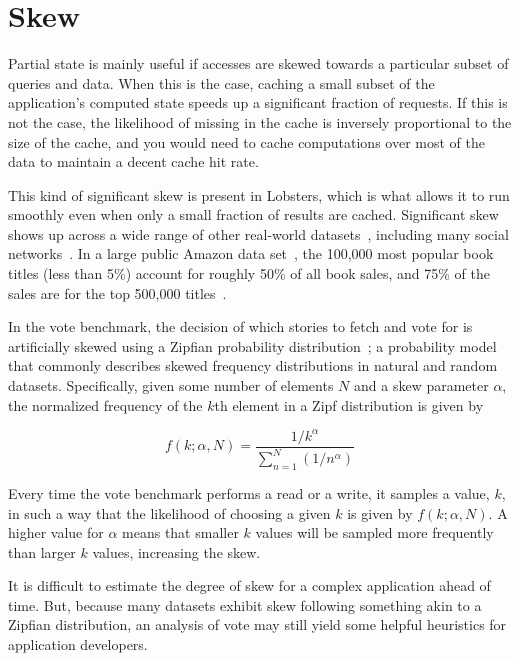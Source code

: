 \section{Skew}
\label{s:eval:patterns}

Partial state is mainly useful if accesses are skewed towards a particular
subset of queries and data. When this is the case, caching a small subset of the
application's computed state speeds up a significant fraction of requests. If
this is not the case, the likelihood of missing in the cache is inversely
proportional to the size of the cache, and you would need to cache computations
over most of the data to maintain a decent cache hit rate.

This kind of significant skew is present in Lobsters, which is what allows it to
run smoothly even when only a small fraction of results are cached. Significant
skew shows up across a wide range of other real-world
datasets~\cite{power1,power2,network-skew,large-skew-analysis}, including many
social networks~\cite{network-skew2, community-skew}. In a large public Amazon
data set~\cite{amazon-skew}, the 100,000 most popular book titles (less than
5\%) account for roughly 50\% of all book sales, and 75\% of the sales are for
the top 500,000 titles~\cite{zhang2020permutation}.

In the vote benchmark, the decision of which stories to fetch and vote for is
artificially skewed using a Zipfian probability distribution~\cite{zipf}; a
probability model that commonly describes skewed frequency distributions in
natural and random datasets. Specifically, given some number of elements $N$ and
a skew parameter $\alpha$, the normalized frequency of the $k$th element in a
Zipf distribution is given by

\begin{displaymath}
  f\left(k;\alpha,N\right)={\frac {1/k^{\alpha}}{\sum \limits _{n=1}^{N}(1/n^{\alpha})}}
\end{displaymath}

Every time the vote benchmark performs a read or a write, it samples a value,
$k$, in such a way that the likelihood of choosing a given $k$ is given by
$f\left(k;\alpha,N\right)$. A higher value for $\alpha$ means that smaller $k$
values will be sampled more frequently than larger $k$ values, increasing the
skew.

It is difficult to estimate the degree of skew for a complex application ahead
of time. But, because many datasets exhibit skew following something akin to a
Zipfian distribution, an analysis of vote may still yield some helpful
heuristics for application developers.

